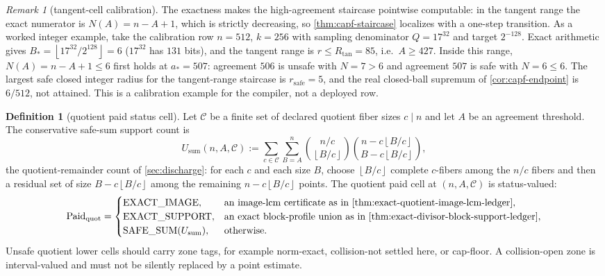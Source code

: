 \documentclass[11pt]{article}
\theoremstyle{definition}
\newtheorem{definition}[definition]{Definition}
\theoremstyle{remark}
\newtheorem{remark}[remark]{Remark}
\providecommand{\Paid}{\operatorname{Paid}}
\providecommand{\floor}[1]{\left\lfloor #1\right\rfloor}
\begin{document}
\begin{remark}[tangent-cell calibration]\label{rem:capf-tangent-calibration}
The exactness makes the high-agreement staircase pointwise computable: in the tangent range the exact numerator is $N(A)=n-A+1$, which is strictly decreasing, so \cref{thm:capf-staircase} localizes with a one-step transition.  As a worked integer example, take the calibration row $n=512$, $k=256$ with sampling denominator $Q=17^{32}$ and target $2^{-128}$.  Exact arithmetic gives $B_*=\floor{17^{32}/2^{128}}=6$ \textup{($17^{32}$ has $131$ bits)}, and the tangent range is $r\le R_{\tan}=85$, i.e.\ $A\ge427$.  Inside this range, $N(A)=n-A+1\le6$ first holds at $a_*=507$: agreement $506$ is unsafe with $N=7>6$ and agreement $507$ is safe with $N=6\le6$.  The largest safe closed integer radius for the tangent-range staircase is $r_{\mathrm{safe}}=5$, and the real closed-ball supremum of \cref{cor:capf-endpoint} is $6/512$, not attained.  This is a calibration example for the compiler, not a deployed row.
\end{remark}

\begin{definition}[quotient paid status cell]\label{def:capf-quotient-status}
Let $\mathcal C$ be a finite set of declared quotient fiber sizes $c\mid n$ and let $A$ be an agreement threshold.  The conservative safe-sum support count is
\[
U_{\mathrm{sum}}(n,A,\mathcal C):=
\sum_{c\in\mathcal C}\sum_{B=A}^{n}
\binom{n/c}{\floor{B/c}}
\binom{n-c\floor{B/c}}{B-c\floor{B/c}},
\]
the quotient-remainder count of \cref{sec:discharge}: for each $c$ and each size $B$, choose $\floor{B/c}$ complete $c$-fibers among the $n/c$ fibers and then a residual set of size $B-c\floor{B/c}$ among the remaining $n-c\floor{B/c}$ points.  The quotient paid cell at $(n,A,\mathcal C)$ is status-valued:
\[
\Paid_{\mathrm{quot}}=
\begin{cases}
\mathrm{EXACT\_IMAGE}, & \text{an image-lcm certificate as in \cref{thm:exact-quotient-image-lcm-ledger}},\\
\mathrm{EXACT\_SUPPORT}, & \text{an exact block-profile union as in \cref{thm:exact-divisor-block-support-ledger}},\\
\mathrm{SAFE\_SUM}(U_{\mathrm{sum}}), & \text{otherwise}.
\end{cases}
\]
Unsafe quotient lower cells should carry zone tags, for example norm-exact, collision-not settled here, or cap-floor.  A collision-open zone is interval-valued and must not be silently replaced by a point estimate.
\end{definition}
\end{document}
